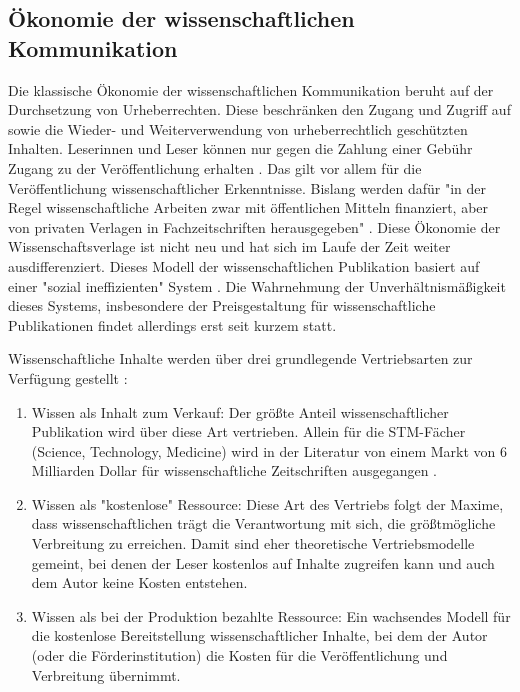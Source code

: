 \begin{enumerate}
\begin{end}
\subsection{Ökonomie der wissenschaftlichen Kommunikation}
Die klassische Ökonomie der wissenschaftlichen Kommunikation beruht auf der Durchsetzung von Urheberrechten. Diese beschränken den Zugang und Zugriff auf sowie die Wieder- und Weiterverwendung von urheberrechtlich geschützten Inhalten. Leserinnen und Leser können nur gegen die Zahlung einer Gebühr Zugang zu der Veröffentlichung erhalten \cite{CREATe_2014}. Das gilt vor allem für die Veröffentlichung wissenschaftlicher Erkenntnisse. Bislang werden dafür "in der Regel wissenschaftliche Arbeiten zwar mit öffentlichen Mitteln finanziert, aber von privaten Verlagen in Fachzeitschriften herausgegeben" \cite{WD_bundestag_2009}. Diese Ökonomie der Wissenschaftsverlage ist nicht neu und hat sich im Laufe der Zeit weiter ausdifferenziert. Dieses Modell der wissenschaftlichen Publikation basiert auf einer "sozial ineffizienten" System \cite{mueller-langer_2010}. Die Wahrnehmung der Unverhältnismäßigkeit dieses Systems, insbesondere der Preisgestaltung für wissenschaftliche Publikationen \cite{King_2008} findet allerdings erst seit kurzem statt\cite{CREATe_2014}.

Wissenschaftliche Inhalte werden über drei grundlegende Vertriebsarten zur Verfügung gestellt \cite{cope2014future}:
\begin{enumerate}
\item Wissen als Inhalt zum Verkauf: Der größte Anteil wissenschaftlicher Publikation wird über diese Art vertrieben. Allein für die STM-Fächer (Science, Technology, Medicine) wird in der Literatur von einem Markt von 6 Milliarden Dollar für wissenschaftliche Zeitschriften ausgegangen .
\item Wissen als "kostenlose" Ressource: Diese Art des Vertriebs folgt der Maxime, dass wissenschaftlichen trägt die Verantwortung mit sich, die größtmögliche Verbreitung zu erreichen. Damit sind eher theoretische Vertriebsmodelle gemeint, bei denen der Leser kostenlos auf Inhalte zugreifen kann und auch dem Autor keine Kosten entstehen.
\item Wissen als bei der Produktion bezahlte Ressource: Ein wachsendes Modell für die kostenlose Bereitstellung wissenschaftlicher Inhalte, bei dem der Autor (oder die Förderinstitution) die Kosten für die Veröffentlichung und Verbreitung übernimmt.
\end{enumerate}


\end{end}
\end{enumerate}
